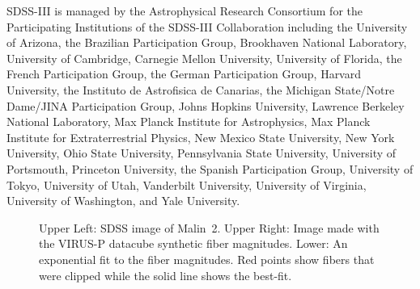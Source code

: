 \documentclass{emulateapj}
\begin{document}
SDSS-III is managed by the Astrophysical Research Consortium for the Participating Institutions of the SDSS-III Collaboration including the University of Arizona, the Brazilian Participation Group, Brookhaven National Laboratory, University of Cambridge, Carnegie Mellon University, University of Florida, the French Participation Group, the German Participation Group, Harvard University, the Instituto de Astrofisica de Canarias, the Michigan State/Notre Dame/JINA Participation Group, Johns Hopkins University, Lawrence Berkeley National Laboratory, Max Planck Institute for Astrophysics, Max Planck Institute for Extraterrestrial Physics, New Mexico State University, New York University, Ohio State University, Pennsylvania State University, University of Portsmouth, Princeton University, the Spanish Participation Group, University of Tokyo, University of Utah, Vanderbilt University, University of Virginia, University of Washington, and Yale University.



%
%





\begin{figure}
\caption{Upper Left:  SDSS image of Malin~2.  Upper Right:  Image made with the VIRUS-P datacube synthetic fiber magnitudes.  Lower:  An exponential fit to the fiber magnitudes.  Red points show fibers that were clipped while the solid line shows the best-fit.  \label{Malin2_fibers} }
\end{figure}









\end{document}
